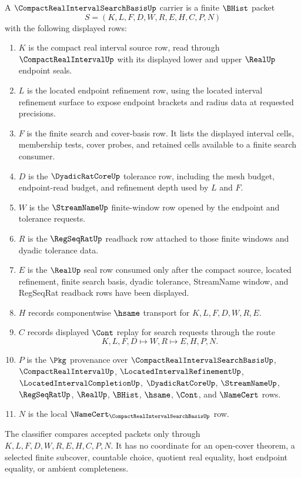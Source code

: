 \begin{definition}
\label{def:compact-real-interval-search-basis-carrier}
A $\CompactRealIntervalSearchBasisUp$ carrier is a finite $\BHist$ packet
$$
S=(K,L,F,D,W,R,E,H,C,P,N)
$$
with the following displayed rows:
\begin{enumerate}
\item $K$ is the compact real interval source row, read through $\CompactRealIntervalUp$ with its displayed lower and upper $\RealUp$ endpoint seals.
\item $L$ is the located endpoint refinement row, using the located interval refinement surface to expose endpoint brackets and radius data at requested precisions.
\item $F$ is the finite search and cover-basis row. It lists the displayed interval cells, membership tests, cover probes, and retained cells available to a finite search consumer.
\item $D$ is the $\DyadicRatCoreUp$ tolerance row, including the mesh budget, endpoint-read budget, and refinement depth used by $L$ and $F$.
\item $W$ is the $\StreamNameUp$ finite-window row opened by the endpoint and tolerance requests.
\item $R$ is the $\RegSeqRatUp$ readback row attached to those finite windows and dyadic tolerance data.
\item $E$ is the $\RealUp$ seal row consumed only after the compact source, located refinement, finite search basis, dyadic tolerance, StreamName window, and RegSeqRat readback rows have been displayed.
\item $H$ records componentwise $\hsame$ transport for $K,L,F,D,W,R,E$.
\item $C$ records displayed $\Cont$ replay for search requests through the route
$$
K,L,F,D \longmapsto W,R \longmapsto E,H,P,N .
$$
\item $P$ is the $\Pkg$ provenance over $\CompactRealIntervalSearchBasisUp$, $\CompactRealIntervalUp$, $\LocatedIntervalRefinementUp$, $\LocatedIntervalCompletionUp$, $\DyadicRatCoreUp$, $\StreamNameUp$, $\RegSeqRatUp$, $\RealUp$, $\BHist$, $\hsame$, $\Cont$, and $\NameCert$ rows.
\item $N$ is the local $\NameCert_{\CompactRealIntervalSearchBasisUp}$ row.
\end{enumerate}
The classifier compares accepted packets only through $K,L,F,D,W,R,E,H,C,P,N$. It has no coordinate for an open-cover theorem, a selected finite subcover, countable choice, quotient real equality, host endpoint equality, or ambient completeness.
\end{definition}

